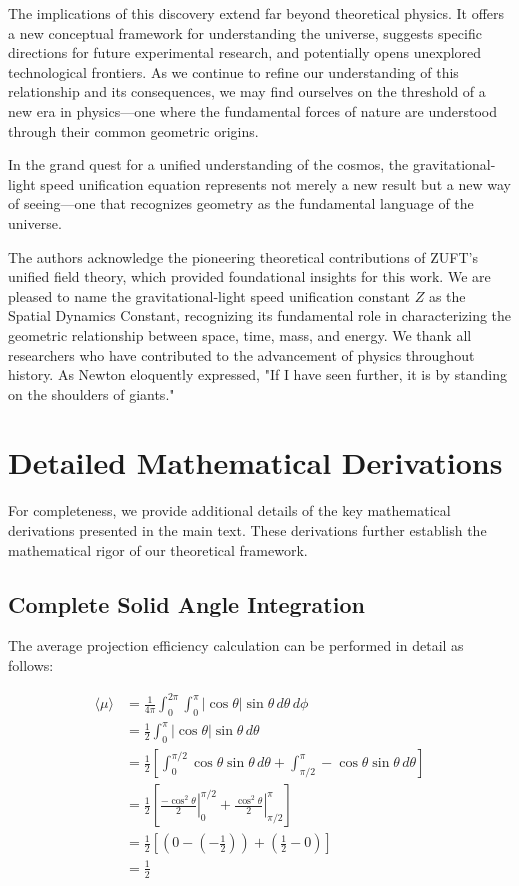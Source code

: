\documentclass[nature,numbers]{article}
\newcommand{\expre}[1]{\begin{align}#1\end{align}} %
\begin{document}
The implications of this discovery extend far beyond theoretical physics. It offers a new conceptual framework for understanding the universe, suggests specific directions for future experimental research, and potentially opens unexplored technological frontiers. As we continue to refine our understanding of this relationship and its consequences, we may find ourselves on the threshold of a new era in physics—one where the fundamental forces of nature are understood through their common geometric origins.

In the grand quest for a unified understanding of the cosmos, the gravitational-light speed unification equation represents not merely a new result but a new way of seeing—one that recognizes geometry as the fundamental language of the universe.

\acknowledgments
The authors acknowledge the pioneering theoretical contributions of ZUFT's unified field theory, which provided foundational insights for this work. We are pleased to name the gravitational-light speed unification constant $Z$ as the Spatial Dynamics Constant, recognizing its fundamental role in characterizing the geometric relationship between space, time, mass, and energy. We thank all researchers who have contributed to the advancement of physics throughout history. As Newton eloquently expressed, "If I have seen further, it is by standing on the shoulders of giants."

\appendix
\section{Detailed Mathematical Derivations}

For completeness, we provide additional details of the key mathematical derivations presented in the main text. These derivations further establish the mathematical rigor of our theoretical framework.

\subsection{Complete Solid Angle Integration}

The average projection efficiency calculation can be performed in detail as follows:

\expre{\langle \mu \rangle &= \frac{1}{4\pi} \int_0^{2\pi} \int_0^\pi |\cos\theta| \sin\theta \, d\theta \, d\phi \\
&= \frac{1}{2} \int_0^\pi |\cos\theta| \sin\theta \, d\theta \\
&= \frac{1}{2} \left[ \int_0^{\pi/2} \cos\theta \sin\theta \, d\theta + \int_{\pi/2}^\pi -\cos\theta \sin\theta \, d\theta \right] \\
&= \frac{1}{2} \left[ \left. \frac{-\cos^2\theta}{2} \right|_0^{\pi/2} + \left. \frac{\cos^2\theta}{2} \right|_{\pi/2}^\pi \right] \\
&= \frac{1}{2} \left[ \left( 0 - \left( -\frac{1}{2} \right) \right) + \left( \frac{1}{2} - 0 \right) \right] \\
&= \frac{1}{2}
}
\end{document}
